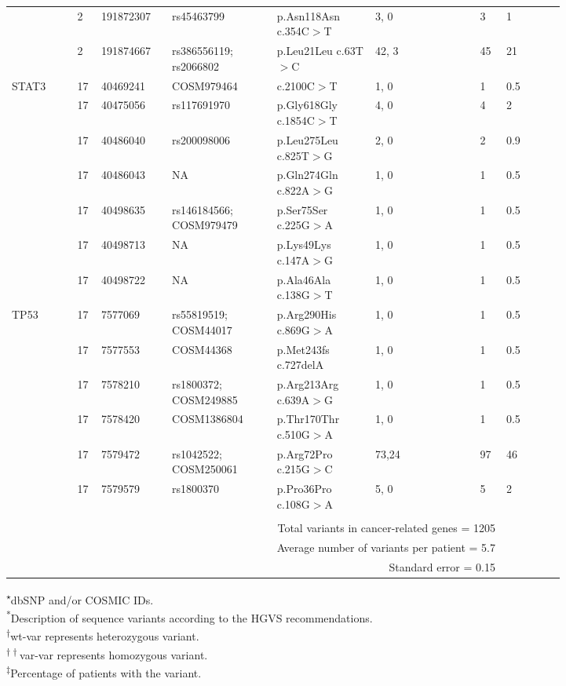 \begin{longtable}{p{0.1\linewidth}|p{0.02\linewidth}p{0.1\linewidth}p{0.16\linewidth}p{0.15\linewidth}p{0.16\linewidth}p{0.04\linewidth}p{0.09\linewidth}}
		\\
		& 2 & 191872307 & rs45463799 & p.Asn118Asn c.354C$>$T & 3, 0 & 3 & 1
		\\
		& 2 & 191874667 & rs386556119; rs2066802 & p.Leu21Leu c.63T$>$C & 42, 3 & 45 & 21
		\\
		\hline
		STAT3 & 17 & 40469241 & COSM979464 & c.2100C$>$T & 1, 0 & 1 & 0.5
		\\
		& 17 & 40475056 & rs117691970 & p.Gly618Gly c.1854C$>$T & 4, 0 & 4 & 2
		\\
		& 17 & 40486040 & rs200098006 & p.Leu275Leu c.825T$>$G & 2, 0 & 2 & 0.9
		\\
		& 17 & 40486043 & NA & p.Gln274Gln c.822A$>$G & 1, 0 & 1 & 0.5
		\\
		& 17 & 40498635 & rs146184566; COSM979479 & p.Ser75Ser c.225G$>$A & 1, 0 & 1 & 0.5
		\\
		& 17 & 40498713 & NA & p.Lys49Lys c.147A$>$G & 1, 0 & 1 & 0.5
		\\
		& 17 & 40498722 & NA & p.Ala46Ala c.138G$>$T & 1, 0 & 1 & 0.5
		\\
		\hline
		TP53 & 17 & 7577069 & rs55819519; COSM44017 & p.Arg290His c.869G$>$A & 1, 0 & 1 & 0.5
		\\
		& 17 & 7577553 & COSM44368 & p.Met243fs c.727delA & 1, 0 & 1 & 0.5
		\\
		& 17 & 7578210 & rs1800372; COSM249885 & p.Arg213Arg c.639A$>$G & 1, 0 & 1 & 0.5
		\\
		& 17 & 7578420 & COSM1386804 & p.Thr170Thr c.510G$>$A & 1, 0 & 1 & 0.5
		\\
		& 17 & 7579472 & rs1042522; COSM250061 & p.Arg72Pro c.215G$>$C & 73,24 & 97 & 46
		\\
		& 17 & 7579579 & rs1800370 & p.Pro36Pro c.108G$>$A & 5, 0 & 5 & 2
		\\
		\hline
		\\
		&
		\multicolumn{6}{r}{Total variants in cancer-related genes = 1205}
		\\
		&
		\multicolumn{6}{r}{Average number of variants per patient = 5.7}
		\\
		&
		\multicolumn{6}{r}{Standard error = 0.15}
		\\
		\hline
\end{longtable}

\newpage
\noindent\textsuperscript{$\star$}dbSNP and/or COSMIC IDs.
\\
\textsuperscript{*}Description of sequence variants according to the HGVS recommendations.
\\
\textsuperscript{$\dagger$}wt-var represents heterozygous variant.
\\
\textsuperscript{$\dagger\dagger$}var-var represents homozygous variant.
\\\textsuperscript{$\ddagger$}Percentage of patients with the variant.


